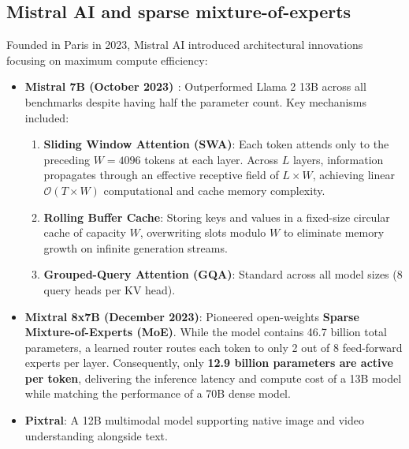 \documentclass[../../main.tex]{subfiles}
\begin{document}
\subsection{Mistral AI and sparse mixture-of-experts}
\label{subsec:open_models_mistral}

Founded in Paris in 2023, Mistral AI introduced architectural innovations focusing on maximum compute efficiency:
\begin{itemize}
    \item \textbf{Mistral 7B (October 2023) \cite{jiang2023mistral}}:
    Outperformed Llama 2 13B across all benchmarks despite having half the parameter count. Key mechanisms included:
    \begin{enumerate}
        \item \textbf{Sliding Window Attention (SWA)}: Each token attends only to the preceding $W = 4096$ tokens at each layer. Across $L$ layers, information propagates through an effective receptive field of $L \times W$, achieving linear $\mathcal{O}(T \times W)$ computational and cache memory complexity.
        \item \textbf{Rolling Buffer Cache}: Storing keys and values in a fixed-size circular cache of capacity $W$, overwriting slots modulo $W$ to eliminate memory growth on infinite generation streams.
        \item \textbf{Grouped-Query Attention (GQA)}: Standard across all model sizes (8 query heads per KV head).
    \end{enumerate}
    \item \textbf{Mixtral 8x7B (December 2023)}:
    Pioneered open-weights \textbf{Sparse Mixture-of-Experts (MoE)}. While the model contains 46.7 billion total parameters, a learned router routes each token to only 2 out of 8 feed-forward experts per layer. Consequently, only \textbf{12.9 billion parameters are active per token}, delivering the inference latency and compute cost of a 13B model while matching the performance of a 70B dense model.
    \item \textbf{Pixtral}: A 12B multimodal model supporting native image and video understanding alongside text.
\end{itemize}
\end{document}
